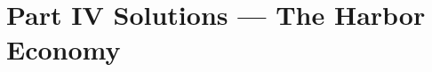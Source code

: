 
\providecommand{\wbtier}[1]{{\scshape\bfseries\textcolor{hhcobalt}{#1}}\enspace}
\providecommand{\wbcheck}{\wbtier{Check.}}
\providecommand{\wbtrace}{\wbtier{Trace.}}
\providecommand{\wbopen}{\wbtier{Open.}}
\providecommand{\wbstar}{{\textcolor{hhcobalt}{$\bigstar$}}\,}

\section*{Part IV Solutions --- The Harbor Economy}

